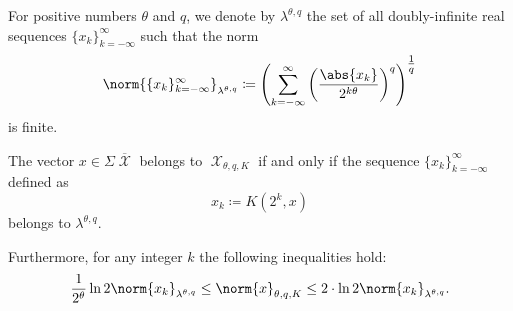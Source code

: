 \begin{definition}\label{def:discrete_k_interpolation_space}
  For positive numbers \( \theta \) and \( q \), we denote by \( \lambda^{\theta,q} \) the set of all doubly-infinite real sequences \( \{ x_k \}_{k=-\infty}^\infty \) such that the norm
  \begin{equation}\label{eq:def:discrete_k_interpolation_space}
    \norm{\{ x_k \}_{k=-\infty}^\infty}_{\lambda^{\theta,q}} \coloneqq \left( \sum_{k=-\infty}^\infty \left( \frac {\abs{x_k}} {2^{k\theta}} \right)^q \right)^{\tfrac 1 q}
  \end{equation}
  is finite.
\end{definition}

\begin{theorem}\label{thm:discrete_k_interpolation}\mcite\cite[lemma 3.1.3]{Bergh1976}
  The vector \( x \in \Sigma\overline{\mscrX} \) belongs to \hyperref[def:k_functional_interpolation_space]{\( \mscrX_{\theta,q,K} \)} if and only if the sequence \( \{ x_k \}_{k=-\infty}^\infty \) defined as
  \begin{equation}\label{eq:thm:discrete_k_interpolation/sequence}
    x_k \coloneqq K(2^k, x)
  \end{equation}
  belongs to \hyperref[def:discrete_k_interpolation_space]{\( \lambda^{\theta,q} \)}.

  Furthermore, for any integer \( k \) the following inequalities hold:
  \begin{equation}\label{eq:thm:discrete_k_interpolation/inequalities}
    \frac 1 {2^\theta} \ln 2 \norm{x_k}_{\lambda^{\theta,q}}
    \leq
    \norm{x}_{\theta,q,K}
    \leq
    2 \cdot \ln 2 \norm{x_k}_{\lambda^{\theta,q}}.
  \end{equation}
\end{theorem}
